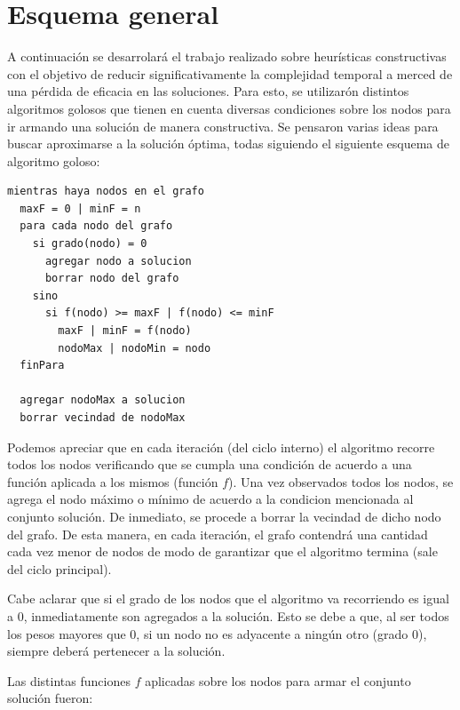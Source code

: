 \documentclass[a4paper,11pt] {article}
\begin{document}
\section*{Esquema general}

A continuaci\'on se desarrolar\'a el trabajo realizado sobre heur\'isticas constructivas con el objetivo de reducir significativamente la complejidad temporal a merced de una p\'erdida de eficacia en las soluciones. Para esto, se utilizar\'on distintos algoritmos golosos que tienen en cuenta diversas condiciones sobre los nodos para ir armando una soluci\'on de manera constructiva. Se pensaron varias ideas para buscar aproximarse a la soluci\'on \'optima, todas siguiendo el siguiente esquema de algoritmo goloso:

\begin{verbatim}
mientras haya nodos en el grafo
  maxF = 0 | minF = n
  para cada nodo del grafo
    si grado(nodo) = 0
      agregar nodo a solucion
      borrar nodo del grafo
    sino
      si f(nodo) >= maxF | f(nodo) <= minF
        maxF | minF = f(nodo)
        nodoMax | nodoMin = nodo
  finPara

  agregar nodoMax a solucion
  borrar vecindad de nodoMax
\end{verbatim}

Podemos apreciar que en cada iteraci\'on (del ciclo interno) el algoritmo recorre todos los nodos verificando que se cumpla una condici\'on de acuerdo a una funci\'on aplicada a los mismos (funci\'on $f$). Una vez observados todos los nodos, se agrega el nodo m\'aximo o m\'inimo de acuerdo a la condicion mencionada al conjunto soluci\'on. De inmediato, se procede a borrar la vecindad de dicho nodo del grafo. De esta manera, en cada iteraci\'on, el grafo contendr\'a una cantidad cada vez menor de nodos de modo de garantizar que el algoritmo termina (sale del ciclo principal).

Cabe aclarar que si el grado de los nodos que el algoritmo va recorriendo es igual a 0, inmediatamente son agregados a la soluci\'on. Esto se debe a que, al ser todos los pesos mayores que 0, si un nodo no es adyacente a ning\'un otro (grado 0), siempre deber\'a pertenecer a la soluci\'on.

Las distintas funciones $f$ aplicadas sobre los nodos para armar el conjunto soluci\'on fueron:
\end{document}
